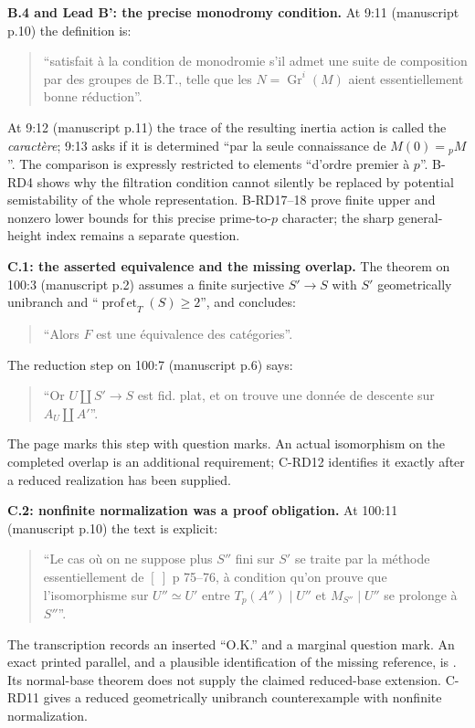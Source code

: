 \par\smallskip\noindent\textbf{B.4 and Lead B': the precise monodromy condition.}
At 9:11 (manuscript p.10) the definition is:
\begin{quote}
``satisfait à la condition de monodromie s'il admet une suite de
composition par des groupes de B.T., telle que les
$N=\operatorname{Gr}^i(M)$ aient essentiellement bonne réduction''.
\end{quote}
At 9:12 (manuscript p.11) the trace of the resulting inertia action
is called the \emph{caractère}; 9:13 asks if it is determined
``par la seule connaissance de $M(0)={}_pM$''. The comparison is
expressly restricted to elements ``d'ordre premier à $p$''.
B-RD4 shows why the filtration condition cannot silently be replaced
by potential semistability of the whole representation. B-RD17--18
prove finite upper and nonzero lower bounds for this precise
prime-to-$p$ character; the sharp general-height index remains a
separate question.

\par\smallskip\noindent\textbf{C.1: the asserted equivalence and the missing overlap.}
The theorem on 100:3 (manuscript p.2) assumes a finite surjective
$S'\to S$ with $S'$ geometrically unibranch and
``$\operatorname{prof\,et}_T(S)\geq2$'', and concludes:
\begin{quote}
``Alors $F$ est une équivalence des catégories''.
\end{quote}
The reduction step on 100:7 (manuscript p.6) says:
\begin{quote}
``Or $U\amalg S'\to S$ est fid. plat, et on trouve une donnée de
descente sur $A_U\amalg A'$''.
\end{quote}
The page marks this step with question marks. An actual isomorphism
on the completed overlap is an additional requirement; C-RD12
identifies it exactly after a reduced realization has been supplied.

\par\smallskip\noindent\textbf{C.2: nonfinite normalization was a proof obligation.}
At 100:11 (manuscript p.10) the text is explicit:
\begin{quote}
``Le cas où on ne suppose plus $S''$ fini sur $S'$ se traite par la
méthode essentiellement de $[\ ]$ p 75--76, à condition qu'on
prouve que l'isomorphisme sur $U''\simeq U'$ entre
$T_p(A'')\mid U''$ et $M_{S''}\mid U''$ se prolonge à $S''$''.
\end{quote}
The transcription records an inserted ``O.K.'' and a marginal
question mark. An exact printed parallel, and a plausible identification of the missing reference, is
\cite[proof of Corollary~4.2, pp.75--76]{Grothendieck1966Hom}.
Its normal-base theorem does not supply the claimed reduced-base
extension. C-RD11 gives a reduced geometrically unibranch
counterexample with nonfinite normalization.

